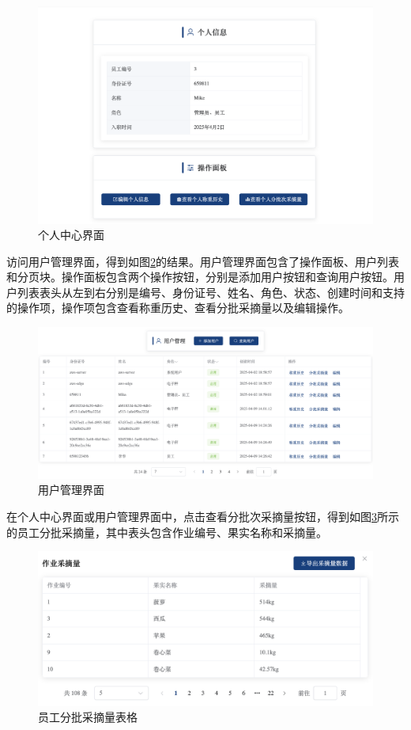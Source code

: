 \begin{figure}
    \centering
    \includegraphics[width=0.9\linewidth]{../result/web-me.png}
    \caption{个人中心界面}
    \label{fig:web-me}
\end{figure}

访问用户管理界面，得到如图\ref{fig:web-user}的结果。用户管理界面包含了操作面板、用户列表和分页块。操作面板包含两个操作按钮，分别是添加用户按钮和查询用户按钮。用户列表表头从左到右分别是编号、身份证号、姓名、角色、状态、创建时间和支持的操作项，操作项包含查看称重历史、查看分批采摘量以及编辑操作。

\begin{figure}
    \centering
    \includegraphics[width=0.9\linewidth]{../result/web-user.png}
    \caption{用户管理界面}
    \label{fig:web-user}
\end{figure}

在个人中心界面或用户管理界面中，点击查看分批次采摘量按钮，得到如图\ref{fig:chart-user-works}所示的员工分批采摘量，其中表头包含作业编号、果实名称和采摘量。

\begin{figure}
    \centering
    \includegraphics[width=0.9\linewidth]{../result/chart-user-works.png}
    \caption{员工分批采摘量表格}
    \label{fig:chart-user-works}
\end{figure}


